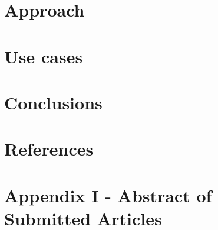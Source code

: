 \documentclass[a4paper,11pt]{article}
\begin{document}



\section{Approach}


\section{Use cases}



\section{Conclusions}




\section{References}



\section{Appendix I - Abstract of Submitted Articles}

\end{document}
